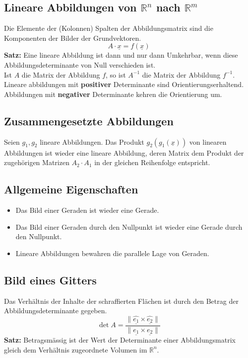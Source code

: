 \subsection{Lineare Abbildungen von $\mathbb{R}^n$ nach $\mathbb{R}^m$}
Die Elemente der (Kolonnen) Spalten der Abbildungsmatrix sind die Komponenten der Bilder der
Grundvektoren.
\begin{equation}
  A\cdot\underline{x} = f(\underline{x})
\end{equation}
\textbf{Satz:} Eine lineare Abbildung ist dann und nur dann Umkehrbar, wenn diese Abbildungsdeterminante
von Null verschieden ist. \\
Ist $A$ die Matrix der Abbildung $f$, so ist $A^{-1}$ die Matrix der Abbildung $f^{-1}$. \\
Lineare abbildungen mit \textbf{positiver} Determinante sind Orientierungserhaltend. Abbildungen mit
\textbf{negativer} Determinante kehren die Orientierung um.

\subsection{Zusammengesetzte Abbildungen}
Seien $g_1, g_2$ lineare Abbildungen. Das Produkt $g_2\left({g_1(\underline{x})}\right)$ von linearen Abbildungen ist wieder eine lineare Abbildung, deren Matrix dem Produkt der zugeh\"origen Matrizen $A_2\cdot A_1$ in der gleichen Reihenfolge entspricht.

\subsection{Allgemeine Eigenschaften}
\begin{itemize}
  \item Das Bild einer Geraden ist wieder eine Gerade.
  \item Das Bild einer Geraden durch den Nullpunkt ist wieder eine Gerade durch den Nullpunkt.
  \item Lineare Abbildungen bewahren die parallele Lage von Geraden.
\end{itemize}

\subsection{Bild eines Gitters}
Das Verh\"altnis der Inhalte der schraffierten Fl\"achen ist durch den Betrag der Abbildungsdeterminante gegeben.
\begin{equation}
  \det{A} = \frac{\|\underline{\hat{e_1}} \times \underline{\hat{e_2}} \|}{\|\underline{e_1} \times \underline{e_2}\|}
\end{equation}
\textbf{Satz:} Betragsm\"assig ist der Wert der Determinante einer Abbildungsmatrix gleich dem Verh\"altnis
zugeordnete Volumen im $\mathbb{R}^n$.


